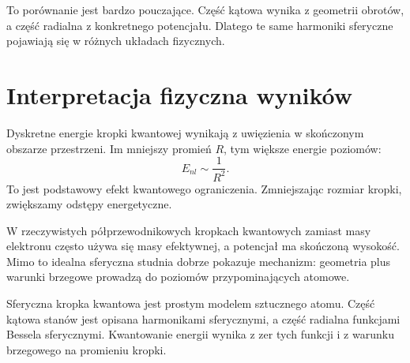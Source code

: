 To porównanie jest bardzo pouczające. Część kątowa wynika z geometrii obrotów, a część radialna z konkretnego potencjału. Dlatego te same harmoniki sferyczne pojawiają się w różnych układach fizycznych.

\section{Interpretacja fizyczna wyników}

Dyskretne energie kropki kwantowej wynikają z uwięzienia w skończonym obszarze przestrzeni. Im mniejszy promień \(R\), tym większe energie poziomów:
\begin{equation}
    E_{nl}\sim \frac{1}{R^2}.
\end{equation}
To jest podstawowy efekt kwantowego ograniczenia. Zmniejszając rozmiar kropki, zwiększamy odstępy energetyczne.

W rzeczywistych półprzewodnikowych kropkach kwantowych zamiast masy elektronu często używa się masy efektywnej, a potencjał ma skończoną wysokość. Mimo to idealna sferyczna studnia dobrze pokazuje mechanizm: geometria plus warunki brzegowe prowadzą do poziomów przypominających atomowe.

\begin{summarybox}
Sferyczna kropka kwantowa jest prostym modelem sztucznego atomu. Część kątowa stanów jest opisana harmonikami sferycznymi, a część radialna funkcjami Bessela sferycznymi. Kwantowanie energii wynika z zer tych funkcji i z warunku brzegowego na promieniu kropki.
\end{summarybox}
